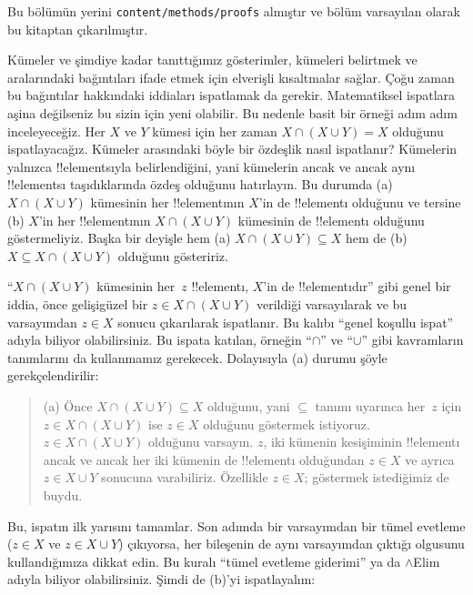 \documentclass[../../../include/open-logic-section]{subfiles}
\begin{document}

\begin{editorial}
Bu bölümün yerini \verb|content/methods/proofs| almıştır ve bölüm varsayılan
olarak bu kitaptan çıkarılmıştır.
\end{editorial}

\begin{explain}
Kümeler ve şimdiye kadar tanıttığımız gösterimler, kümeleri belirtmek ve
aralarındaki bağıntıları ifade etmek için elverişli kısaltmalar sağlar. Çoğu
zaman bu bağıntılar hakkındaki iddiaları ispatlamak da gerekir. Matematiksel
ispatlara aşina değilseniz bu sizin için yeni olabilir. Bu nedenle basit bir
örneği adım adım inceleyeceğiz. Her $X$ ve $Y$ kümesi için her zaman
$X \cap (X \cup Y) = X$ olduğunu ispatlayacağız. Kümeler arasındaki böyle bir
özdeşlik nasıl ispatlanır? Kümelerin yalnızca !!{element}s{}ıyla belirlendiğini,
yani kümelerin ancak ve ancak aynı !!{element}s{}ı taşıdıklarında özdeş olduğunu
hatırlayın. Bu durumda (a) $X \cap (X \cup Y)$ kümesinin her !!{element}{}ının
$X$'in de !!{element}{}ı olduğunu ve tersine (b) $X$'in her !!{element}{}ının
$X \cap (X \cup Y)$ kümesinin de !!{element}{}ı olduğunu göstermeliyiz. Başka
bir deyişle hem (a) $X \cap (X \cup Y) \subseteq X$ hem de
(b) $X \subseteq X \cap (X \cup Y)$ olduğunu gösteririz.

``$X \cap (X \cup Y)$ kümesinin her~$z$ !!{element}{}ı, $X$'in de
!!{element}{}ıdır'' gibi genel bir iddia, önce gelişigüzel bir
$z \in X \cap (X \cup Y)$ verildiği varsayılarak ve bu varsayımdan
$z \in X$ sonucu çıkarılarak ispatlanır. Bu kalıbı ``genel koşullu ispat''
adıyla biliyor olabilirsiniz. Bu ispata katılan, örneğin ``$\cap$'' ve
``$\cup$'' gibi kavramların tanımlarını da kullanmamız gerekecek. Dolayısıyla
(a) durumu şöyle gerekçelendirilir:

\begin{quote}
(a) Önce $X \cap (X \cup Y) \subseteq X$ olduğunu, yani $\subseteq$ tanımı
uyarınca her~$z$ için $z \in X \cap (X \cup Y)$ ise $z \in X$ olduğunu
göstermek istiyoruz. $z \in X \cap (X \cup Y)$ olduğunu varsayın. $z$, iki
kümenin kesişiminin !!{element}{}ı ancak ve ancak her iki kümenin de
!!{element}{}ı olduğundan $z \in X$ ve ayrıca $z \in X \cup Y$ sonucuna
varabiliriz. Özellikle $z \in X$; göstermek istediğimiz de buydu.
\end{quote}

Bu, ispatın ilk yarısını tamamlar. Son adımda bir varsayımdan bir tümel
evetleme ($z \in X$ ve $z \in X \cup Y$) çıkıyorsa, her bileşenin de aynı
varsayımdan çıktığı olgusunu kullandığımıza dikkat edin. Bu kuralı ``tümel
evetleme giderimi'' ya da $\land$Elim adıyla biliyor olabilirsiniz. Şimdi de
(b)'yi ispatlayalım:


\end{explain}
\end{document}
